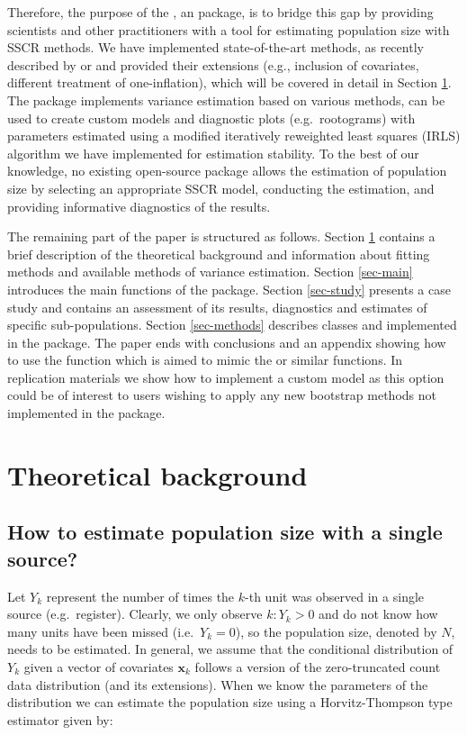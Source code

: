 \documentclass[
]{jss}
\newcommand{\1}{\mathcal{I}} \newcommand{\bZero}{\boldsymbol{0}}
\begin{document}
Therefore, the purpose of the , an 
package, is to bridge this gap by providing scientists and other
practitioners with a tool for estimating population size with SSCR
methods. We have implemented state-of-the-art methods, as recently
described by \citet{bohning2018capture} or \citet{bohning2024one} and
provided their extensions (e.g., inclusion of covariates, different
treatment of one-inflation), which will be covered in detail in Section
\ref{sec-theory}. The package implements variance estimation based on
various methods, can be used to create custom models and diagnostic
plots (e.g.~rootograms) with parameters estimated using a modified
iteratively reweighted least squares (IRLS) algorithm we have
implemented for estimation stability. To the best of our knowledge, no
existing open-source package allows the estimation of population size by
selecting an appropriate SSCR model, conducting the estimation, and
providing informative diagnostics of the results.

The remaining part of the paper is structured as follows. Section
\ref{sec-theory} contains a brief description of the theoretical
background and information about fitting methods and available methods
of variance estimation. Section \ref{sec-main} introduces the main
functions of the package. Section \ref{sec-study} presents a case study
and contains an assessment of its results, diagnostics and estimates of
specific sub-populations. Section \ref{sec-methods} describes classes
and  implemented in the package. The paper ends with
conclusions and an appendix showing how to use the
 function which is aimed to mimic the
 or similar functions. In replication materials we show
how to implement a custom model as this option could be of interest to
users wishing to apply any new bootstrap methods not implemented in the
package.

\section{Theoretical background}\label{sec-theory}

\subsection{How to estimate population size with a single
source?}\label{how-to-estimate-population-size-with-a-single-source}

Let \(Y_{k}\) represent the number of times the \(k\)-th unit was
observed in a single source (e.g.~register). Clearly, we only observe
\(k:Y_{k}>0\) and do not know how many units have been missed
(i.e.~\(Y_{k}=0\)), so the population size, denoted by \(N\), needs to
be estimated. In general, we assume that the conditional distribution of
\(Y_{k}\) given a vector of covariates \(\boldsymbol{x}_{k}\) follows a
version of the zero-truncated count data distribution (and its
extensions). When we know the parameters of the distribution we can
estimate the population size using a Horvitz-Thompson type estimator
given by:
\end{document}
